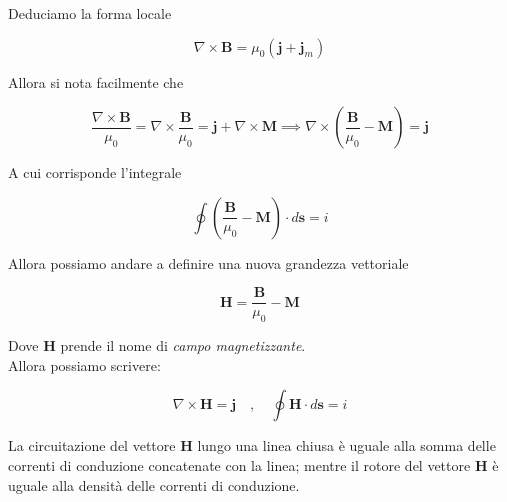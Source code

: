 Deduciamo la forma locale 

\begin{tcolorbox}[colback=yellow!10!white, colframe=orange!70!black, boxrule=0.8pt]
\begin{equation}
        \nabla \times \mathbf{B} = \mu_0 (\mathbf{j} + \mathbf{j}_m)
\end{equation}
\end{tcolorbox}

Allora si nota facilmente che 

\begin{equation}
    \frac{\nabla \times \mathbf{B}}{\mu_0} = \nabla \times \frac{\mathbf{B}}{\mu_0} = \mathbf{j} + \nabla \times \mathbf{M} \implies \nabla \times \left( \frac{\mathbf{B}}{\mu_0} - \mathbf{M} \right) = \mathbf{j}
\end{equation}

A cui corrisponde l'integrale 

\begin{equation}
    \oint \left( \frac{\mathbf{B}}{\mu_0} - \mathbf{M} \right) \cdot d \mathbf{s} = i
\end{equation}

\newpage

Allora possiamo andare a definire una nuova grandezza vettoriale 

\begin{tcolorbox}[colback=yellow!10!white, colframe=orange!70!black, boxrule=0.8pt]
\begin{equation}
        \mathbf{H} = \frac{\mathbf{B}}{\mu_0} - \mathbf{M}
\end{equation}
\end{tcolorbox}

Dove $\mathbf{H}$ prende il nome di \emph{campo magnetizzante}.  \\

Allora possiamo scrivere:

\begin{tcolorbox}[colback=yellow!10!white, colframe=orange!70!black, boxrule=0.8pt]
\begin{equation}
        \nabla \times \mathbf{H} = \mathbf{j} \quad , \quad \oint \mathbf{H} \cdot d\mathbf{s} = i
\end{equation}
\end{tcolorbox}

La circuitazione del vettore $\mathbf{H}$ lungo una linea chiusa è uguale alla somma delle correnti di conduzione concatenate con la linea; mentre il rotore del vettore $\mathbf{H}$ è uguale alla densità delle correnti di conduzione.\\

